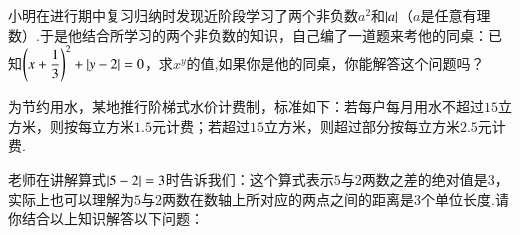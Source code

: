 \documentclass[10pt]{BHCexam}
\begin{document}
\begin{questions}
\vspace{3cm}
小明在进行期中复习归纳时发现近阶段学习了两个非负数$a^2$和$\left| a \right|$（$a$是任意有理数）.于是他结合所学习的两个非负数的知识，自己编了一道题来考他的同桌：已知$\left(x+\dfrac{1}{3}\right)^2+\left| y-2 \right|=0$，求$x^y$的值,如果你是他的同桌，你能解答这个问题吗？

\vspace{5cm}

为节约用水，某地推行阶梯式水价计费制，标准如下：若每户每月用水不超过$15$立方米，则按每立方米$1.5$元计费；若超过$15$立方米，则超过部分按每立方米$2.5$元计费.

\vspace{5cm}

老师在讲解算式$\left| 5-2 \right|=3$时告诉我们：这个算式表示$5$与$2$两数之差的绝对值是$3$，实际上也可以理解为$5$与$2$两数在数轴上所对应的两点之间的距离是$3$个单位长度.请你结合以上知识解答以下问题：


\end{questions}
\end{document}
